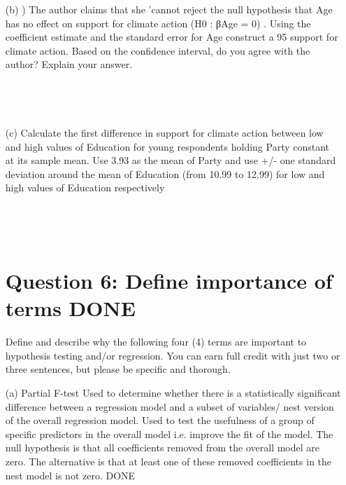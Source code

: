 \documentclass[12pt,letterpaper]{article}
\begin{document}
{\begin{enumerate}
\begin{verbatim}
			\end{verbatim}
			\item [(b)] ) The author claims that she ’cannot reject the null hypothesis that Age has no effect
			on support for climate action (H0 : βAge = 0) . Using the coefficient estimate and the
			standard error for Age construct a 95%
			support for climate action. Based on the confidence interval, do you agree with the
			author? Explain your answer.
			
			\begin{verbatim}
				
				
				
			\end{verbatim}
			\item [(c)] Calculate the first difference in support for climate action between low and high values
			of Education for young respondents holding Party constant at its sample mean. Use
			3.93 as the mean of Party and use +/- one standard deviation around the mean of
			Education (from 10.99 to 12.99) for low and high values of Education respectively
			
			\begin{verbatim}
				
				
				
			\end{verbatim}
			\vspace{.5cm}
			\newpage
			\section*{Question 6: Define importance of terms DONE}
			Define and describe why the following four (4) terms are important to hypothesis testing
			and/or regression. You can earn full credit with just two or three sentences, but please be
			specific and thorough.
			\item [(a)] Partial F-test
			Used to determine whether there is a statistically significant difference between a regression model and a subset of variables/ nest version of the overall regression model. Used to test the usefulness of a group of specific predictors in the overall model i.e. improve the fit of the model.
			The null hypothesis is that all coefficients removed from the overall model are zero. The alternative is that at least one of these removed coefficients in the nest model is not zero. DONE
			

\end{enumerate}}
\end{document}
